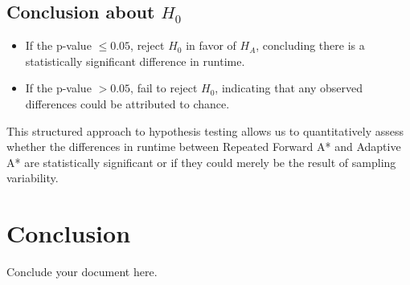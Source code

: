 \documentclass{article}
\begin{document}
\subsection{Conclusion about \(H_0\)}
\begin{itemize}
    \item If the p-value \(\leq 0.05\), reject \(H_0\) in favor of \(H_A\), concluding there is a statistically significant difference in runtime.
    \item If the p-value \(> 0.05\), fail to reject \(H_0\), indicating that any observed differences could be attributed to chance.
\end{itemize}

This structured approach to hypothesis testing allows us to quantitatively assess whether the differences in runtime between Repeated Forward A* and Adaptive A* are statistically significant or if they could merely be the result of sampling variability.


\section{Conclusion}
Conclude your document here.
\end{document}
